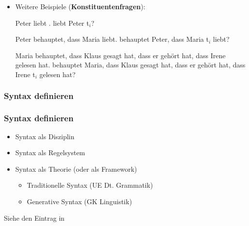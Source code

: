 \begin{frame}

\begin{itemize}

	\item Weitere Beispiele (\textbf{Konstituentenfragen}):

	\eal
	\ex Peter liebt .
	\ex {} liebt Peter t$_i$?
	\zl

\pause

	\eal 
	\ex Peter behauptet, dass Maria  liebt. 
	\ex {} behauptet Peter, dass Maria t$_i$ liebt? 
	\zl

\pause

	\eal
	\zl

\pause

	\eal 
	\ex Maria behauptet, dass Klaus gesagt hat, dass er gehört hat, 	dass Irene  gelesen hat. 
	\ex {} behauptet Maria, dass Klaus gesagt hat, dass er gehört hat, dass Irene t$_i$ gelesen hat?
	\zl

\end{itemize}

\end{frame}


\subsubsection{Syntax definieren}



\begin{frame}
\frametitle{Syntax definieren}

\begin{itemize}
	\item Syntax als Disziplin
	\item Syntax als Regelsystem
	\item Syntax als Theorie (oder als Framework)
	\begin{itemize}
		\item Traditionelle Syntax (\ras UE Dt. Grammatik)
		\item Generative Syntax (\ras GK Linguistik)
	\end{itemize}
\end{itemize}

Siehe den Eintrag  in \citet{Glueck&Roedel16a}

\end{frame}


